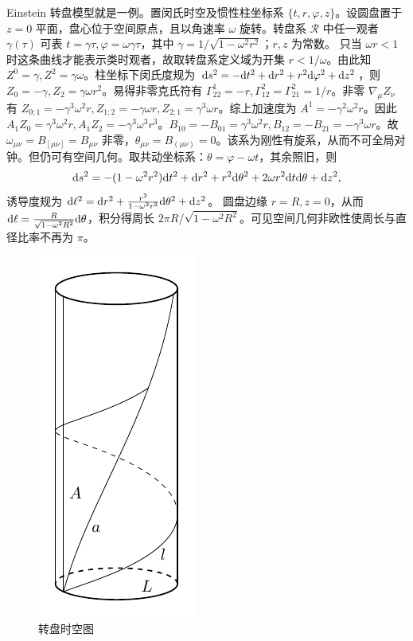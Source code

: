 Einstein 转盘模型就是一例。置闵氏时空及惯性柱坐标系 $\{t,r,\varphi,z\}$。设圆盘置于 $z=0$ 平面，盘心位于空间原点，且以角速率 $\omega$ 旋转。转盘系 $\mathscr R$ 中任一观者 $\gamma(\tau)$ 可表 $t=\gamma\tau,\varphi=\omega\gamma\tau$，其中 $\gamma=1/\sqrt{1-\omega^2r^2}$；$r,z$ 为常数。
只当 $\omega r<1$ 时这条曲线才能表示类时观者，故取转盘系定义域为开集 $r<1/\omega$。由此知 $Z^0=\gamma,Z^2=\gamma\omega$。柱坐标下闵氏度规为 $\dd s^2=-\dd t^2+\dd r^2+r^2\dd\varphi^2+\dd z^2$，则 $Z_0=-\gamma,Z_2=\gamma\omega r^2$。易得非零克氏符有 $\Gamma^1_{22}=-r,\Gamma^2_{12}=\Gamma^2_{21}=1/r$。非零 $\nabla_\mu Z_{\nu}$ 有 $Z_{0;1}=-\gamma^3\omega^2 r, Z_{1;2}=-\gamma\omega r, Z_{2;1}=\gamma^3\omega r$。综上加速度为 $A^1=-\gamma^2\omega^2 r$。因此 $A_1 Z_0 = \gamma^3\omega^2 r,A_1 Z_2 = -\gamma^3\omega^3 r^3$。$B_{10}=-B_{01}=\gamma^3\omega^2 r, B_{12}=-B_{21}=-\gamma^3\omega r$。故 $\omega_{\mu\nu}=B_{[\mu\nu]} = B_{\mu\nu}$ 非零，$\theta_{\mu\nu}=B_{(\mu\nu)}=0$。该系为刚性有旋系，从而不可全局对钟。但仍可有空间几何。取共动坐标系：$\theta=\varphi-\omega t$，其余照旧，则
\[\dd s^2 = -(1-\omega^2r^2)\dd t^2+\dd r^2+r^2\dd\theta^2+2\omega r^2\dd t\dd\theta+\dd z^2,\]
诱导度规为 $\dd\ell^2 = \dd r^2+\frac{r^2}{1-\omega^2 r^2}\dd\theta^2+\dd z^2$。
圆盘边缘 $r=R,z=0$，从而 $\dd\ell = \frac{R}{\sqrt{1-\omega^2 R^2}}\dd\theta$，积分得周长 ${2\pi R}/\sqrt{1-\omega^2 R^2}$。可见空间几何非欧性使周长与直径比率不再为 $\pi$。

\begin{figure}\centering
    \includegraphics[width=.25\textwidth]{fig/chpt01/twist.pdf}
    \caption{转盘时空图}
\end{figure}

